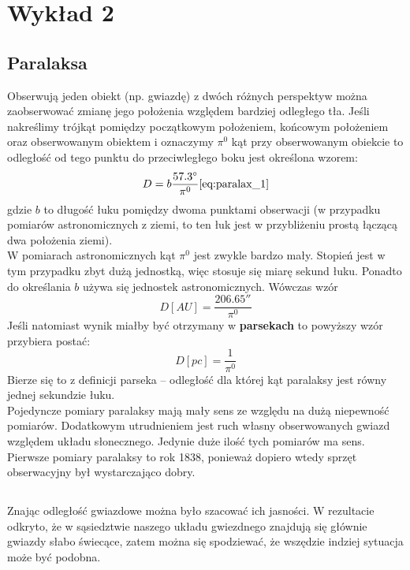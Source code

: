 \documentclass[../index.tex]{subfiles}
\begin{document}
    \section{Wykład 2}
        \subsection{Paralaksa}
            Obserwują jeden obiekt (np. gwiazdę) z dwóch różnych perspektyw można zaobserwować zmianę jego położenia względem bardziej odległego tła. Jeśli nakreślimy trójkąt pomiędzy początkowym położeniem, końcowym położeniem oraz obserwowanym obiektem i oznaczymy \(\pi^{0}\) kąt przy obserwowanym obiekcie to odległość od tego punktu do przeciwległego boku jest określona wzorem:
            \begin{equation}
                D = b \frac{57.3^\circ}{\pi^{0}} \ref{eq:paralax_1}
            \end{equation}
            gdzie \(b\) to długość łuku pomiędzy dwoma punktami obserwacji (w przypadku pomiarów astronomicznych z ziemi, to ten łuk jest w przybliżeniu prostą łączącą dwa położenia ziemi).\\
            W pomiarach astronomicznych kąt \(\pi^{ 0}\) jest zwykle bardzo mały. Stopień jest w tym przypadku zbyt dużą jednostką, więc stosuje się miarę sekund łuku. Ponadto do określania \(b\) używa się jednostek astronomicznych. Wówczas wzór \label{eq:paralax_1}
            \begin{equation}
                D[AU] = \frac{206.65''}{\pi^{0}}  
            \end{equation}
            Jeśli natomiast wynik miałby być otrzymany w \textbf{parsekach} to powyższy wzór przybiera postać:
            \begin{equation}
                D[pc] = \frac{1}{\pi^{0}}
            \end{equation}
            Bierze się to z definicji parseka \--- odległość dla której kąt paralaksy jest równy jednej sekundzie łuku.\\
            Pojedyncze pomiary paralaksy mają mały sens ze względu na dużą niepewność pomiarów. Dodatkowym utrudnieniem jest ruch własny obserwowanych gwiazd względem układu słonecznego. Jedynie duże ilość tych pomiarów ma sens. Pierwsze pomiary paralaksy to rok 1838, ponieważ dopiero wtedy sprzęt obserwacyjny był wystarczająco dobry.
        \subsection{}
            Znając odległość gwiazdowe można było szacować ich jasności. W rezultacie odkryto, że w sąsiedztwie naszego układu gwiezdnego znajdują się głównie gwiazdy słabo świecące, zatem można się spodziewać, że wszędzie indziej sytuacja może być podobna.
\end{document}
